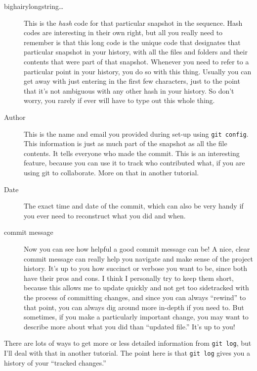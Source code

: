 \documentclass[11pt]{article}
\begin{document}
\begin{description}
\item[bighairylongstring\ldots{}] This is the \emph{hash} code for that particular snapshot in the sequence. Hash codes are interesting in their own right, but all you really need to remember is that this long code is the unique code that designates that particular snapshot in your history, with all the files and folders and their contents that were part of that snapshot.  Whenever you need to refer to a particular point in your history, you do so with this thing.  Usually you can get away with just entering in the first few characters, just to the point that it's not ambiguous with any other hash in your history.  So don't worry, you rarely if ever will have to type out this whole thing.
\item[Author] This is the name and email you provided during set-up using \texttt{git config}. This information is just as much part of the snapshot as all the file contents. It tells everyone who made the commit. This is an interesting feature, because you can use it to track who contributed what, if you are using git to collaborate.  More on that in another tutorial.
\item[Date] The exact time and date of the commit, which can also be very handy if you ever need to reconstruct what you did and when.
\item[commit message] Now you can see how helpful a good commit message can be!  A nice, clear commit message can really help you navigate and make sense of the project history. It's up to you how succinct or verbose you want to be, since both have their pros and cons.  I think I personally try to keep them short, because this allows me to update quickly and not get too sidetracked with the process of committing changes, and since you can always ``rewind'' to that point, you can always dig around more in-depth if you need to.  But sometimes, if you make a particularly important change, you may want to describe more about what you did than ``updated file.''  It's up to you!
\end{description}

There are lots of ways to get more or less detailed information from \texttt{git log}, but I'll deal with that in another tutorial. The point here is that \texttt{git log} gives you a history of your ``tracked changes.''
\end{document}
